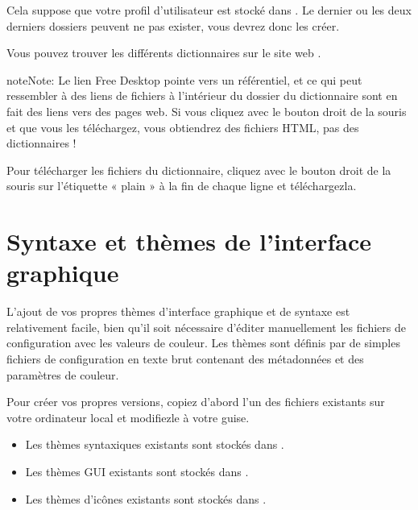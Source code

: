 \documentclass[a4paper,11pt,french]{sphinxmanual}
\begin{document}
\sphinxAtStartPar
{}

\sphinxAtStartPar
Cela suppose que votre profil d’utilisateur est stocké dans . Le dernier ou les deux derniers dossiers peuvent ne pas exister, vous devrez donc les créer.

\sphinxAtStartPar
Vous pouvez trouver les différents dictionnaires sur le site web .

\begin{sphinxadmonition}{note}{Note:}
\sphinxAtStartPar
Le lien Free Desktop pointe vers un référentiel, et ce qui peut ressembler à des liens de fichiers à l’intérieur du dossier du dictionnaire sont en fait des liens vers des pages web. Si vous cliquez avec le bouton droit de la souris et que vous les téléchargez, vous obtiendrez des fichiers HTML, pas des dictionnaires !

\sphinxAtStartPar
Pour télécharger les fichiers du dictionnaire, cliquez avec le bouton droit de la souris sur l’étiquette « plain » à la fin de chaque ligne et téléchargez\sphinxhyphen{}la.
\end{sphinxadmonition}


\section{Syntaxe et thèmes de l’interface graphique}
\label{\detokenize{more_customise:syntax-and-gui-themes}}\label{\detokenize{more_customise:a-custom-theme}}
\sphinxAtStartPar
L’ajout de vos propres thèmes d’interface graphique et de syntaxe est relativement facile, bien qu’il soit nécessaire d’éditer manuellement les fichiers de configuration avec les valeurs de couleur. Les thèmes sont définis par de simples fichiers de configuration en texte brut contenant des métadonnées et des paramètres de couleur.

\sphinxAtStartPar
Pour créer vos propres versions, copiez d’abord l’un des fichiers existants sur votre ordinateur local et modifiez\sphinxhyphen{}le à votre guise.
\begin{itemize}
\item {} 
\sphinxAtStartPar
Les thèmes syntaxiques existants sont stockés dans .

\item {} 
\sphinxAtStartPar
Les thèmes GUI existants sont stockés dans .

\item {} 
\sphinxAtStartPar
Les thèmes d’icônes existants sont stockés dans .

\end{itemize}
\end{document}
